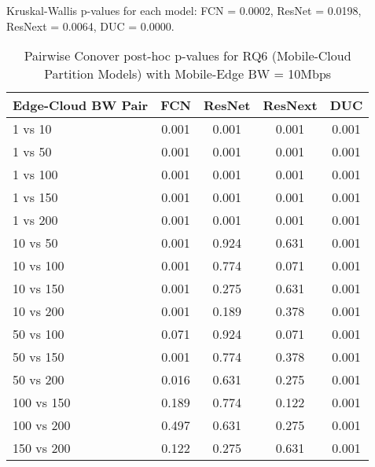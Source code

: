 \begin{table}[h]
\centering
\caption{Pairwise Conover post-hoc p-values for RQ6 (Mobile-Cloud Partition Models) with Mobile-Edge BW = 10Mbps}
\label{tab:conover_mobile_cloud_partition_me10}
\smallskip
Kruskal-Wallis p-values for each model: FCN = 0.0002, ResNet = 0.0198, ResNext = 0.0064, DUC = 0.0000.

\begin{tabular}{lcccc}
\toprule
Edge-Cloud BW Pair & FCN & ResNet & ResNext & DUC \\
\midrule
1 vs 10 & 0.001 & 0.001 & 0.001 & 0.001 \\
1 vs 50 & 0.001 & 0.001 & 0.001 & 0.001 \\
1 vs 100 & 0.001 & 0.001 & 0.001 & 0.001 \\
1 vs 150 & 0.001 & 0.001 & 0.001 & 0.001 \\
1 vs 200 & 0.001 & 0.001 & 0.001 & 0.001 \\
10 vs 50 & 0.001 & 0.924 & 0.631 & 0.001 \\
10 vs 100 & 0.001 & 0.774 & 0.071 & 0.001 \\
10 vs 150 & 0.001 & 0.275 & 0.631 & 0.001 \\
10 vs 200 & 0.001 & 0.189 & 0.378 & 0.001 \\
50 vs 100 & 0.071 & 0.924 & 0.071 & 0.001 \\
50 vs 150 & 0.001 & 0.774 & 0.378 & 0.001 \\
50 vs 200 & 0.016 & 0.631 & 0.275 & 0.001 \\
100 vs 150 & 0.189 & 0.774 & 0.122 & 0.001 \\
100 vs 200 & 0.497 & 0.631 & 0.275 & 0.001 \\
150 vs 200 & 0.122 & 0.275 & 0.631 & 0.001 \\
\bottomrule
\end{tabular}
\end{table}

